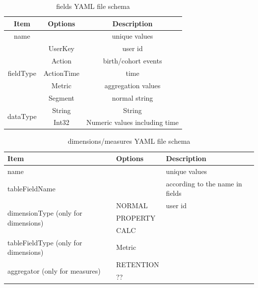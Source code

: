 \documentclass[10pt,conference,letterpaper]{IEEEtran}
\begin{document}
\begin{table}[h!]
\begin{center}
    \begin{tabular}{ |c|c|c| }
        \hline
        Item & Options & Description \\
        \hline
        name & & unique values \\
        \hline
        \multirow{5}{*}{fieldType} & UserKey & user id \\\cline{2-3}
            & Action & birth/cohort events \\\cline{2-3}
            & ActionTime & time \\\cline{2-3}
            & Metric & aggregation values \\\cline{2-3}
            & Segment & normal string \\
        \hline
        \multirow{2}{*}{dataType} & String & String \\\cline{2-3}
            & Int32 & Numeric values including time \\
        \hline
    \end{tabular}
\end{center}
\caption{fields YAML file schema}
\label{table:fields}
\end{table}


\begin{table}[h!]
\begin{center}
    \begin{tabular}{ | p{8em} | p{5em} | p{8em} | }
        \hline
        Item & Options & Description \\
        \hline
        name & & unique values \\
        \hline
        tableFieldName & & according to the name in fields \\
        \hline
        \multirow{3}{*}{dimensionType (only for dimensions)} & NORMAL & user id \\\cline{2-3}
        & PROPERTY &  \\\cline{2-3}
        & CALC & \\
        \hline
        tableFieldType (only for dimensions) & Metric & \\
        \hline
        \multirow{2}{*}{aggregator (only for measures)} & RETENTION & \\\cline{2-3}
        & ?? & \\
        \hline
    \end{tabular}
\end{center}
\caption{dimensions/measures YAML file schema}
\label{table:dims}
\end{table}
\end{document}
